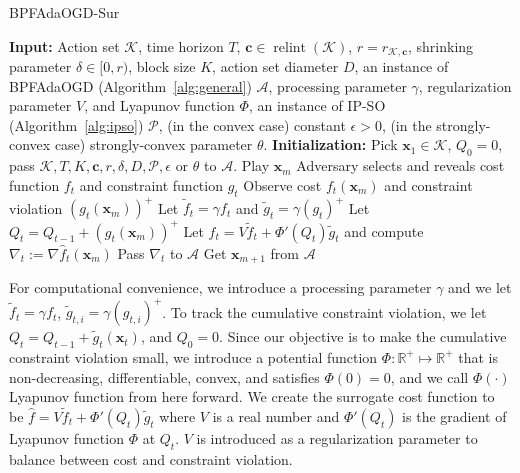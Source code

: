 \documentclass[twoside,11pt,]{article}
\newcommand{\op}[1]{\operatorname{#1}}
\newcommand{\C}[1]{\mathcal{#1}}
\newcommand{\BF}[1]{\mathbf{#1}}
\newcommand{\BB}[1]{\mathbb{#1}}
\newcommand{\K}{\C{K}}
\newcommand{\x}{\BF{x}}
\newcommand{\tf}{\tilde{f}}
\newcommand{\tft}{\tilde{f}_t}
\newcommand{\tg}{\tilde{g}}
\newcommand{\tgt}{\tilde{g}_t}
\newcommand{\hf}{\hat{f}}
\newcommand{\hft}{\hat{f}_t}
\begin{document}
\begin{algorithm}[ht]
\caption{ BPFAdaOGD-Sur }  
\label{alg:constrained}
\begin{algorithmic}[1]
\STATE \textbf{Input:} Action set $\K$, time horizon $T$, $\BF{c} \in \op{relint}(\K)$, $r = r_{\K, \BF{c}}$, shrinking parameter $\delta \in [0,r)$, block size $K$, action set diameter $D$, an instance of BPFAdaOGD (Algorithm~\ref{alg:general}) $\C{A}$, processing parameter $\gamma$, regularization parameter $V$, and Lyapunov function $\Phi$, an instance of IP-SO (Algorithm~\ref{alg:ipso}) $\C{P}$, (in the convex case) constant $\epsilon > 0$, (in the strongly-convex case) strongly-convex parameter $\theta$. 
\STATE \textbf{Initialization:} Pick $\x_1 \in \K$, $Q_0=0$, pass $\K,T,K,\BF{c},r,\delta,D,\C{P}, \epsilon \text{ or } \theta$ to $\C{A}$. 
    \FOR{$t \in \C{T}_m$}
        \STATE Play $\x_m$
        \STATE Adversary selects and reveals cost function $f_t$ and constraint function $g_t$
        \STATE Observe cost $f_t(\x_m)$ and constraint violation $(g_t(\x_m))^+$
        \STATE Let $\tft = \gamma f_t$ and $\tgt=\gamma (g_t)^+$
        \STATE Let $Q_t = Q_{t-1}+(g_t(\x_m))^+$
        \STATE Let $\hft = V\tft + \Phi'(Q_t)\tg_t$ and compute $\nabla_t := \nabla \hft(\x_m)$
        \STATE Pass $\nabla_t$ to $\C{A}$
    \ENDFOR
    \STATE Get $\x_{m+1}$ from $\C{A}$
\ENDFOR
\end{algorithmic}
\end{algorithm}


For computational convenience, we introduce a processing parameter $\gamma$ and we let $\tf_t = \gamma f_t$, $\tilde{g}_{t,i}=\gamma(g_{t,i})^+$. To track the cumulative constraint violation, we let $Q_t=Q_{t-1}+\tilde{g}_t(\x_t)$, and $Q_0=0$. Since our objective is to make the cumulative constraint violation small, we introduce a potential function $\Phi: \BB{R}^+\mapsto\BB{R}^+$ that is non-decreasing, differentiable, convex, and satisfies $\Phi(0)=0$, and we call $\Phi(\cdot)$ Lyapunov function from here forward. We create the surrogate cost function to be $\hf = V\tf_t + \Phi'(Q_t)\tg_t$ where $V$ is a real number and $\Phi'(Q_t)$ is the gradient of Lyapunov function $\Phi$ at $Q_t$. $V$ is introduced as a regularization parameter to balance between cost and constraint violation.
\end{document}
